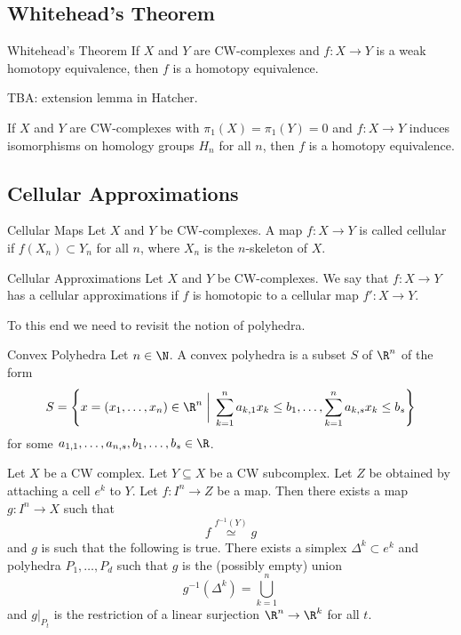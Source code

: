 \documentclass[a4paper]{article}
\begin{document}
\subsection{Whitehead's Theorem}
\begin{thm}{Whitehead's Theorem}{} If $X$ and $Y$ are CW-complexes and $f:X\to Y$ is a weak homotopy equivalence, then $f$ is a homotopy equivalence. 
\end{thm}

TBA: extension lemma in Hatcher. 

\begin{crl}{}{} If $X$ and $Y$ are CW-complexes with $\pi_1(X)=\pi_1(Y)=0$ and $f:X\to Y$ induces isomorphisms on homology groups $H_n$ for all $n$, then $f$ is a homotopy equivalence. 
\end{crl}

\subsection{Cellular Approximations}
\begin{defn}{Cellular Maps}{} Let $X$ and $Y$ be CW-complexes. A map $f:X\to Y$ is called cellular if $f(X_n)\subset Y_n$ for all $n$, where $X_n$ is the $n$-skeleton of $X$. 
\end{defn}

\begin{defn}{Cellular Approximations}{} Let $X$ and $Y$ be CW-complexes. We say that $f:X\to Y$ has a cellular approximations if $f$ is homotopic to a cellular map $f':X\to Y$. 
\end{defn}

To this end we need to revisit the notion of polyhedra. 

\begin{defn}{Convex Polyhedra}{} Let $n\in\N$. A convex polyhedra is a subset $S$ of $\R^n$ of the form $$S=\left\{x=(x_1,\dots,x_n)\in\R^n\;\bigg{|}\;\sum_{k=1}^na_{k,1}x_k\leq b_1,\dots,\sum_{k=1}^n a_{k,s}x_k\leq b_s\right\}$$ for some $a_{1,1},\dots,a_{n,s},b_1,\dots,b_s\in\R$. 
\end{defn}

\begin{lmm}{}{} Let $X$ be a CW complex. Let $Y\subseteq X$ be a CW subcomplex. Let $Z$ be obtained by attaching a cell $e^k$ to $Y$. Let $f:I^n\to Z$ be a map. Then there exists a map $g:I^n\to X$ such that $$f\overset{f^{-1}(Y)}{\simeq} g$$ and $g$ is such that the following is true. There exists a simplex $\Delta^k\subset e^k$ and polyhedra $P_1,\dots,P_d$ such that $g$ is the (possibly empty) union $$g^{-1}(\Delta^k)=\bigcup_{k=1}^n$$ and $g|_{P_t}$ is the restriction of a linear surjection $\R^n\to\R^k$ for all $t$. 
\end{lmm}
\end{document}
